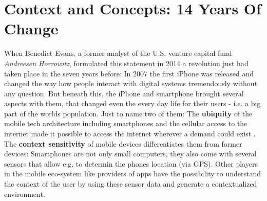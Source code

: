 \section*{Context and Concepts: 14 Years Of Change}
\begin{center}
 \autocite[][]{Evans.2014}
 \end{center}
When Benedict Evans, a former analyst of the U.S. venture capital fund \textit{Andreesen Horrowitz}, formulated this statement in 2014 a revolution just had taken place in the seven years before: In 2007 the first iPhone was released and changed the way how people interact with digital systems tremendously without any question. But beneath this, the iPhone and smartphone brought several aspects with them, that changed even the every day life for their users - i.e. a big part of the worlds population. Just to name two of them: The \textbf{ubiquity} of the mobile tech architecture including smartphones and the cellular access to the internet made it possible to access the internet wherever a demand could exist \autocite[][p.1]{Okazaki.2013}. The \textbf{context sensitivity} of mobile devices differentiates them from former devices: Smartphones are not only small computers, they also come with several sensors that allow e.g. to determin the phones location (via GPS)\autocite[][p.1]{Minch.2004}. Other players in the mobile eco-system like providers of apps have the possibility to understand the context of the user by using these sensor data and generate a contextualized environment.

